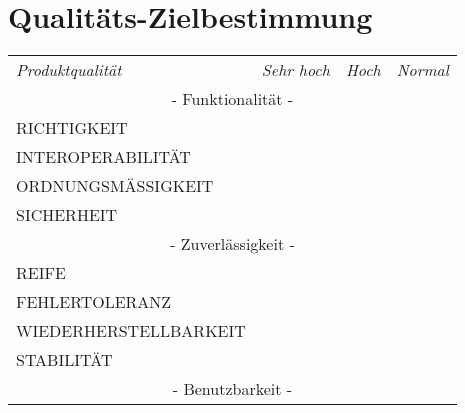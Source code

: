\documentclass[a4paper]{scrreprt}
\begin{document}
    		
    		\newpage
    		
    		\section{Qualitäts-Zielbestimmung}
    		
    	\begin{table}[h!]
    		\centering
    		\begin{tabular}{llll}
    			\multicolumn{1}{l}{\textit{Produktqualität}}& \multicolumn{1}{c}{\textit{Sehr hoch}} & \multicolumn{1}{c}{\textit{Hoch}} & \multicolumn{1}{c}{\textit{Normal}}  \\
    			\multicolumn{4}{c}{- Funktionalität -} \\
    			RICHTIGKEIT                                  &                                        &                                   &                                      \\
    			INTEROPERABILITÄT                            &                                        &                                   &                                      \\
    			ORDNUNGSMÄSSIGKEIT                           &                                        &                                   &                                      \\
    			SICHERHEIT                                   &                                        &                                   &                                      \\
    			\multicolumn{4}{c}{- Zuverlässigkeit -}\\
    			REIFE                                        &                                        &                                   &                                      \\
    			FEHLERTOLERANZ                               &                                        &                                   &                                      \\
    			WIEDERHERSTELLBARKEIT                        &                                        &                                   &                                      \\
    			STABILITÄT                                   &                                        &                                   &                                      \\
    			\multicolumn{4}{c}{- Benutzbarkeit -}\\

\end{tabular}
\end{table}
\end{document}
